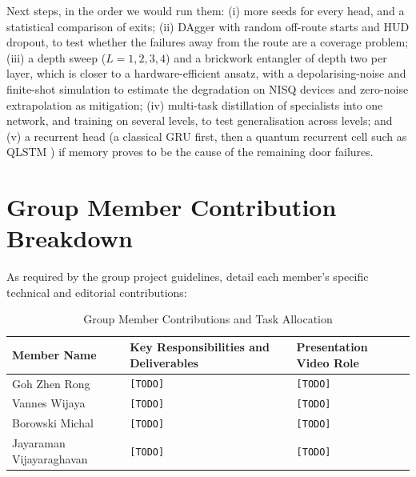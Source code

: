 \documentclass[10pt, a4paper]{article}
\begin{document}
Next steps, in the order we would run them: (i) more seeds for every head, and a statistical comparison of exits; (ii) DAgger with random off-route starts and HUD dropout, to test whether the failures away from the route are a coverage problem; (iii) a depth sweep ($L=1,2,3,4$) and a brickwork entangler of depth two per layer, which is closer to a hardware-efficient ansatz, with a depolarising-noise and finite-shot simulation to estimate the degradation on NISQ devices and zero-noise extrapolation as mitigation; (iv) multi-task distillation of specialists into one network, and training on several levels, to test generalisation across levels; and (v) a recurrent head (a classical GRU first, then a quantum recurrent cell such as QLSTM \cite{chen_qlstm_2020}) if memory proves to be the cause of the remaining door failures.

\section{Group Member Contribution Breakdown}
\label{sec:contributions}
As required by the group project guidelines, detail each member's specific technical and editorial contributions:

\begin{table}[htbp]
\centering
\footnotesize
\renewcommand{\arraystretch}{1.1}
\caption{Group Member Contributions and Task Allocation}
\label{tab:contributions}
\begin{tabularx}{\textwidth}{lXp{4.2cm}}
\toprule
\textbf{Member Name} & \textbf{Key Responsibilities and Deliverables} & \textbf{Presentation Video Role} \\
\midrule
Goh Zhen Rong & \texttt{[TODO]} & \texttt{[TODO]} \\
Vannes Wijaya & \texttt{[TODO]} & \texttt{[TODO]} \\
Borowski Michal & \texttt{[TODO]} & \texttt{[TODO]} \\
Jayaraman Vijayaraghavan & \texttt{[TODO]} & \texttt{[TODO]} \\
\bottomrule
\end{tabularx}
\end{table}
\printbibliography
\end{document}
